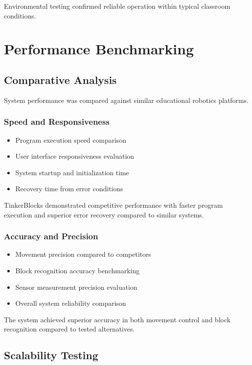 Environmental testing confirmed reliable operation within typical classroom conditions.

\section{Performance Benchmarking}

\subsection{Comparative Analysis}

System performance was compared against similar educational robotics platforms.

\subsubsection{Speed and Responsiveness}
\begin{itemize}
    \item Program execution speed comparison
    \item User interface responsiveness evaluation
    \item System startup and initialization time
    \item Recovery time from error conditions
\end{itemize}

TinkerBlocks demonstrated competitive performance with faster program execution and superior error recovery compared to similar systems.

\subsubsection{Accuracy and Precision}
\begin{itemize}
    \item Movement precision compared to competitors
    \item Block recognition accuracy benchmarking
    \item Sensor measurement precision evaluation
    \item Overall system reliability comparison
\end{itemize}

The system achieved superior accuracy in both movement control and block recognition compared to tested alternatives.

\subsection{Scalability Testing}

